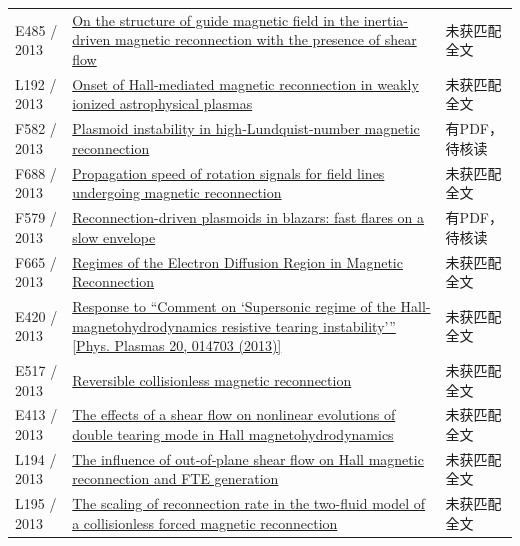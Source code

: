 \begin{longtable}{P{24mm}P{97mm}P{27mm}}
E485 / 2013 & \href{https://doi.org/10.1063/1.4829039}{On the structure of guide magnetic field in the inertia-driven magnetic reconnection with the presence of shear flow} & 未获匹配全文\\

L192 / 2013 & \href{https://doi.org/10.1093/mnras/stt1155}{Onset of Hall-mediated magnetic reconnection in weakly ionized astrophysical plasmas} & 未获匹配全文\\

F582 / 2013 & \href{https://doi.org/10.1063/1.4802941}{Plasmoid instability in high-Lundquist-number magnetic reconnection} & 有PDF，待核读\\

F688 / 2013 & \href{https://doi.org/10.1063/1.4825132}{Propagation speed of rotation signals for field lines undergoing magnetic reconnection} & 未获匹配全文\\

F579 / 2013 & \href{https://doi.org/10.1093/mnras/stt167}{Reconnection-driven plasmoids in blazars: fast flares on a slow envelope} & 有PDF，待核读\\

F665 / 2013 & \href{https://doi.org/10.1103/physrevlett.110.135004}{Regimes of the Electron Diffusion Region in Magnetic Reconnection} & 未获匹配全文\\

E420 / 2013 & \href{https://doi.org/10.1063/1.4789450}{Response to “Comment on ‘Supersonic regime of the Hall-magnetohydrodynamics resistive tearing instability’” [Phys. Plasmas 20,  014703 (2013)]} & 未获匹配全文\\

E517 / 2013 & \href{https://doi.org/10.1063/1.4826201}{Reversible collisionless magnetic reconnection} & 未获匹配全文\\

E413 / 2013 & \href{https://doi.org/10.1016/j.physleta.2013.07.014}{The effects of a shear flow on nonlinear evolutions of double tearing mode in Hall magnetohydrodynamics} & 未获匹配全文\\

L194 / 2013 & \href{https://doi.org/10.1002/jgra.50417}{The influence of out‐of‐plane shear flow on Hall magnetic reconnection and FTE generation} & 未获匹配全文\\

L195 / 2013 & \href{https://doi.org/10.1017/s0022377812001201}{The scaling of reconnection rate in the two-fluid model of a collisionless forced magnetic reconnection} & 未获匹配全文\\


\end{longtable}

